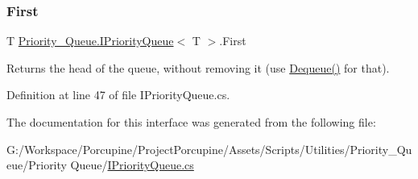 \mbox{\label{interface_priority___queue_1_1_i_priority_queue_a0faa318e892617bedc0f5f9f6c3e6e8b}} 
\subsubsection{\texorpdfstring{First}{First}}
{\footnotesize\ttfamily T \hyperlink{interface_priority___queue_1_1_i_priority_queue}{Priority\+\_\+\+Queue.\+I\+Priority\+Queue}$<$ T $>$.First\hspace{0.3cm}{\ttfamily [get]}}



Returns the head of the queue, without removing it (use \hyperlink{interface_priority___queue_1_1_i_priority_queue_af5f9d687732841a773b3b0d332402b7b}{Dequeue()} for that). 



Definition at line 47 of file I\+Priority\+Queue.\+cs.



The documentation for this interface was generated from the following file\+:\begin{DoxyCompactItemize}
\item 
G\+:/\+Workspace/\+Porcupine/\+Project\+Porcupine/\+Assets/\+Scripts/\+Utilities/\+Priority\+\_\+\+Queue/\+Priority Queue/\hyperlink{_i_priority_queue_8cs}{I\+Priority\+Queue.\+cs}\end{DoxyCompactItemize}
